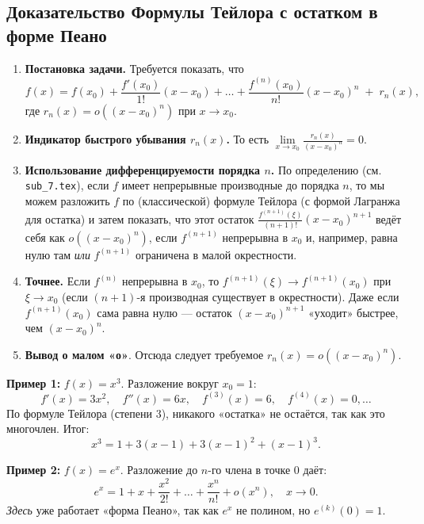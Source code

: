 \subsection*{Доказательство Формулы Тейлора с остатком в форме Пеано}
\begin{enumerate}
  \item \textbf{Постановка задачи.}  
  Требуется показать, что
  \[
  f(x) = f(x_0) + \frac{f'(x_0)}{1!}(x - x_0) + \dots + \frac{f^{(n)}(x_0)}{n!}(x - x_0)^n \;+\; r_n(x),
  \]
  где $r_n(x)=o((x-x_0)^n)$ при $x\to x_0$.
  \item \textbf{Индикатор быстрого убывания $r_n(x)$.}  
  То есть 
  \(\lim\limits_{x\to x_0}\frac{r_n(x)}{(x - x_0)^n}=0.\)
  \item \textbf{Использование дифференцируемости порядка $n$.}  
  По определению (см. \texttt{sub\_7.tex}), если $f$ имеет непрерывные производные до порядка $n$, то мы можем разложить $f$ по (классической) формуле Тейлора (с формой Лагранжа для остатка) и затем показать, что этот остаток $\frac{f^{(n+1)}(\xi)}{(n+1)!}(x-x_0)^{n+1}$ ведёт себя как $o((x-x_0)^n)$, если $f^{(n+1)}$ непрерывна в $x_0$ и, например, равна нулю там \emph{или} $f^{(n+1)}$ ограничена в малой окрестности.
  \item \textbf{Точнее.}  
  Если $f^{(n)}$ непрерывна в $x_0$, то $f^{(n+1)}(\xi)\to f^{(n+1)}(x_0)$ при $\xi\to x_0$ (если $(n+1)$-я производная существует в окрестности). Даже если $f^{(n+1)}(x_0)$ сама равна нулю — остаток $(x-x_0)^{n+1}$ «уходит» быстрее, чем $(x-x_0)^n$.  
  \item \textbf{Вывод о малом «о»}.  
  Отсюда следует требуемое $r_n(x)=o((x - x_0)^n)$. 
\end{enumerate}

\medskip


\textbf{Пример 1:} $f(x)=x^3$. Разложение вокруг $x_0=1$:
\[
f'(x)=3x^2,\quad f''(x)=6x,\quad f^{(3)}(x)=6,\quad f^{(4)}(x)=0,\dots
\]
По формуле Тейлора (степени $3$), никакого «остатка» не остаётся, так как это многочлен. Итог:
\[
x^3 = 1 + 3(x-1) + 3(x-1)^2 + (x-1)^3.
\]

\textbf{Пример 2:} $f(x)=e^x$. Разложение до $n$-го члена в точке $0$ даёт:
\[
e^x = 1 + x + \frac{x^2}{2!} + \dots + \frac{x^n}{n!} + o(x^n),\quad x\to0.
\]
\emph{Здесь} уже работает «форма Пеано», так как $e^x$ не полином, но $e^{(k)}(0)=1$.

\medskip

